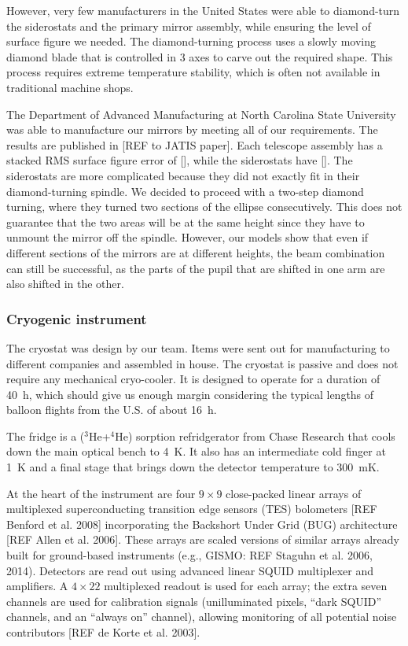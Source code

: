 However, very few manufacturers in the United States were able to diamond-turn the siderostats and the primary mirror assembly, while ensuring the level of surface figure we needed. The diamond-turning process uses a slowly moving diamond blade that is controlled in 3 axes to carve out the required shape. This process requires extreme temperature stability, which is often not available in traditional machine shops. 

The Department of Advanced Manufacturing at North Carolina State University was able to manufacture our mirrors by meeting all of our requirements. The results are published in [REF to JATIS paper]. Each telescope assembly has a stacked RMS surface figure error of [], while the siderostats have []. The siderostats are more complicated because they did not exactly fit in their diamond-turning spindle. We decided to proceed with a two-step diamond turning, where they turned two sections of the ellipse consecutively. This does not guarantee that the two areas will be at the same height since they have to unmount the mirror off the spindle. However, our models show that even if different sections of the mirrors are at different heights, the beam combination can still be successful, as the parts of the pupil that are shifted in one arm are also shifted in the other. 




\subsubsection{Cryogenic instrument}

The cryostat was design by our team. Items were sent out for manufacturing to different companies and assembled in house. The cryostat is passive and does not require any mechanical cryo-cooler. It is designed to operate for a duration of \SI{40}{\hour}, which should give us enough margin considering the typical lengths of balloon flights from the U.S. of about \SI{16}{\hour}. 

The fridge is a ($^3$He+$^4$He) sorption refridgerator from Chase Research that cools down the main optical bench to \SI{4}{\kelvin}. It also has an intermediate cold finger at \SI{1}{\kelvin} and a final stage that brings down the detector temperature to \SI{300}{\milli\kelvin}. 

At the heart of the instrument are four $9\times 9$ close-packed linear arrays of multiplexed superconducting transition edge sensors (TES) bolometers [REF Benford et al. 2008] incorporating the Backshort Under Grid (BUG) architecture [REF Allen et al. 2006]. These arrays are scaled versions of similar arrays already built for ground-based instruments (e.g., GISMO: REF Staguhn et al. 2006, 2014). Detectors are read out using advanced linear SQUID multiplexer and amplifiers. A $4\times 22$ multiplexed readout is used for each array; the extra seven channels are used for calibration signals (unilluminated pixels, “dark SQUID” channels, and an “always on” channel), allowing monitoring of all potential noise contributors [REF de Korte et al. 2003].  


